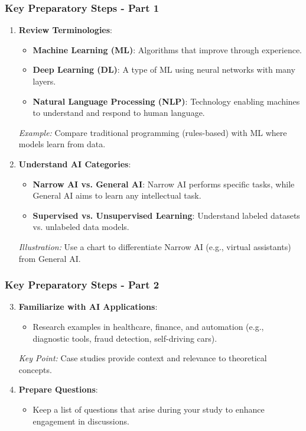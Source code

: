 \documentclass[aspectratio=169]{beamer}
\begin{document}
\begin{frame}[fragile]
    \frametitle{Key Preparatory Steps - Part 1}
    \begin{enumerate}
        \item \textbf{Review Terminologies}:
        \begin{itemize}
            \item \textbf{Machine Learning (ML)}: Algorithms that improve through experience.
            \item \textbf{Deep Learning (DL)}: A type of ML using neural networks with many layers.
            \item \textbf{Natural Language Processing (NLP)}: Technology enabling machines to understand and respond to human language.
        \end{itemize}
        \textit{Example:} Compare traditional programming (rules-based) with ML where models learn from data.
        
        \item \textbf{Understand AI Categories}:
        \begin{itemize}
            \item \textbf{Narrow AI vs. General AI}: Narrow AI performs specific tasks, while General AI aims to learn any intellectual task.
            \item \textbf{Supervised vs. Unsupervised Learning}: Understand labeled datasets vs. unlabeled data models.
        \end{itemize}
        \textit{Illustration:} Use a chart to differentiate Narrow AI (e.g., virtual assistants) from General AI.
    \end{enumerate}
\end{frame}

\begin{frame}[fragile]
    \frametitle{Key Preparatory Steps - Part 2}
    \begin{enumerate}
        \setcounter{enumi}{2} %
        \item \textbf{Familiarize with AI Applications}:
        \begin{itemize}
            \item Research examples in healthcare, finance, and automation (e.g., diagnostic tools, fraud detection, self-driving cars).
        \end{itemize}
        \textit{Key Point:} Case studies provide context and relevance to theoretical concepts.

        \item \textbf{Prepare Questions}:
        \begin{itemize}
            \item Keep a list of questions that arise during your study to enhance engagement in discussions.
        \end{itemize}
    \end{enumerate}
\end{frame}
\end{document}
